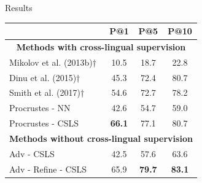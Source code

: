 \documentclass[final]{beamer}
\newlength{\onecolwid}
\begin{document}
\begin{frame}[t]
\begin{columns}[t]
\begin{column}{\onecolwid}
\begin{block}{Results}
\begin{table}[ht]
{\begin{tabular}{|l|c|c|c|}
\hline
 & \textbf{P@1} & \textbf{P@5} & \textbf{P@10} \\
\hline
\multicolumn{4}{|c|}{\textbf{Methods with cross-lingual supervision}} \\
\hline
Mikolov et al. (2013b)† & 10.5 & 18.7 & 22.8 \\
Dinu et al. (2015)† & 45.3 & 72.4 & 80.7 \\
Smith et al. (2017)† & 54.6 & 72.7 & 78.2 \\
Procrustes - NN & 42.6 & 54.7 & 59.0 \\
Procrustes - CSLS & \textbf{66.1} & 77.1 & 80.7 \\
\hline
\multicolumn{4}{|c|}{\textbf{Methods without cross-lingual supervision }} \\
\hline
Adv - CSLS & 42.5 & 57.6 & 63.6\\
Adv - Refine - CSLS & 65.9 & \textbf{79.7} & \textbf{83.1}\\
\hline
\end{tabular}
}
\end{table}
\vspace{-0.45cm}
\begin{table}[ht]
\centering
\setlength{\tabcolsep}{4pt}  %
\renewcommand{\arraystretch}{0.9}
\end{table}
\end{block}
\end{column}
\end{columns}
\end{frame}
\end{document}
